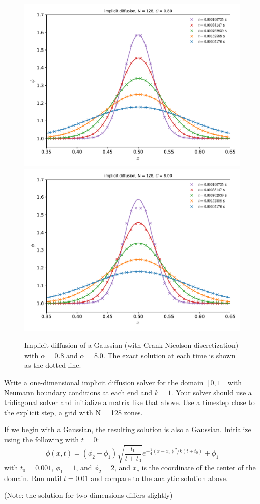 \begin{figure}[t]
\centering
\includegraphics[width=0.495\linewidth]{diff-implicit-128-CFL_0_8}
\includegraphics[width=0.495\linewidth]{diff-implicit-128-CFL_8_0}
\caption[Implicit diffusion of a Gaussian]{\label{fig:diffuse} Implicit diffusion of a Gaussian (with Crank-Nicolson discretization)
  with $\alpha = 0.8$ and $\alpha = 8.0$.  The exact solution at each time is shown as the dotted
  line. \\
  }
\end{figure}

\begin{exercise}
{Write a one-dimensional implicit diffusion solver for the
  domain $[0,1]$ with Neumann boundary conditions at each end and $k = 1$.
  Your solver should use a tridiagonal solver and initialize a matrix like
  that above.  Use a timestep close to the explicit step, a grid with
  N = 128 zones.

  If we begin with a Gaussian, the resulting solution is also a Gaussian.
  Initialize using the following with $t = 0$:
  \begin{equation}
   \phi(x,t) = (\phi_2 - \phi_1) \sqrt{\frac{t_0}{t + t_0}} e^{-\frac{1}{4}(x - x_c)^2/k(t+t_0)} + \phi_1
  \end{equation}
  with $t_0 = 0.001$, $\phi_1 = 1$, and $\phi_2 = 2$, and $x_c$ is the
  coordinate of the center of the domain.  Run until $t = 0.01$ and
  compare to the analytic solution above.

  (Note: the solution for two-dimensions differs slightly) }
\end{exercise}


